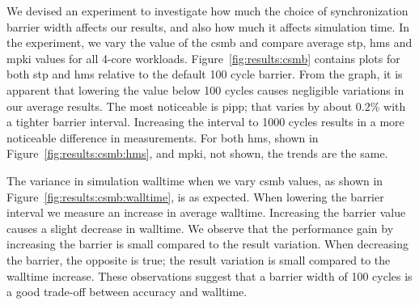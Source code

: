 We devised an experiment to investigate how much the choice of synchronization barrier width affects our results, and also how much it affects simulation time.
In the experiment, we vary the value of the \gls{csmb} and compare average \gls{stp}, \gls{hms} and \gls{mpki} values for all 4-core workloads.
Figure~\ref{fig:results:csmb} contains plots for both \gls{stp} and \gls{hms} relative to the default 100 cycle barrier.
From the graph, it is apparent that lowering the value below 100 cycles causes negligible variations in our average results. 
The most noticeable is \gls{pipp}; that varies by about 0.2\% with a tighter barrier interval.
Increasing the interval to 1000 cycles results in a more noticeable difference in measurements.
For both \gls{hms}, shown in Figure~\ref{fig:results:csmb:hms}, and \gls{mpki}, not shown, the trends are the same.

The variance in simulation walltime when we vary \gls{csmb} values, as shown in Figure~\ref{fig:results:csmb:walltime}, is as expected. 
When lowering the barrier interval we measure an increase in average walltime.
Increasing the barrier value causes a slight decrease in walltime.
We observe that the performance gain by increasing the barrier is small compared to the result variation. 
When decreasing the barrier, the opposite is true; the result variation is small compared to the walltime increase.
These observations suggest that a barrier width of 100 cycles is a good trade-off between accuracy and walltime.